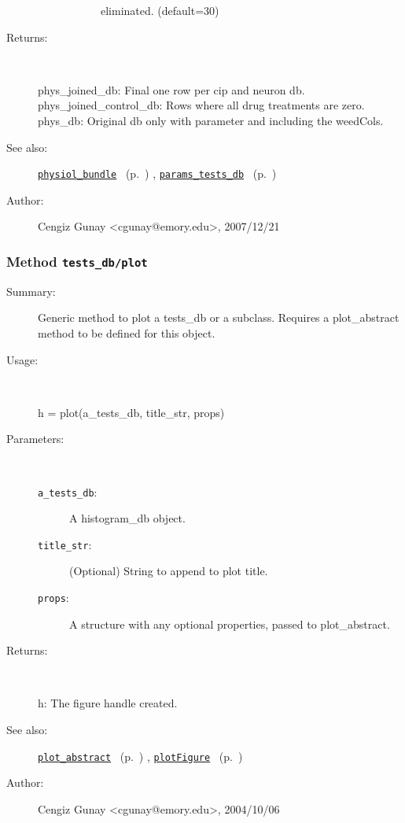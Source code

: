\begin{description}
\begin{description}
\begin{description}
eliminated. (default=30)
\end{description}%
\end{description}%
%
\item[Returns:
]~

	phys\_joined\_db: Final one row per cip and neuron db.
	phys\_joined\_control\_db: Rows where all drug treatments are zero.
	phys\_db: Original db only with parameter and including the weedCols.
%
%
\item[See also:]%
\hyperlink{ref_physiol_bundle}{\texttt{physiol\_bundle}}%
\ (p.~\pageref{ref_physiol_bundle})%
%
, \hyperlink{ref_params_tests_db}{\texttt{params\_tests\_db}}%
\ (p.~\pageref{ref_params_tests_db})%
%
%
\item[Author:]%
Cengiz Gunay <cgunay@emory.edu>, 2007/12/21
%
\end{description}
\methodline%
\subsubsection[Method \texttt{plot}]{Method \texttt{tests\_db/plot}}%
%
\label{ref_tests_db__plot}%
\hypertarget{ref_tests_db__plot}{}%
\begin{description}
\item[Summary:]Generic method to plot a tests\_db or a subclass. Requires a 
	plot\_abstract method to be defined for this object.
%
\item[Usage:]~%
\begin{lyxcode}%
h = plot(a\_tests\_db, title\_str, props)
%
\end{lyxcode}%
%
%
\item[Parameters:]~
\begin{description}%
\item[\texttt{a\_tests\_db}:]
 A histogram\_db object.
\item[\texttt{title\_str}:]
 (Optional) String to append to plot title.
\item[\texttt{props}:]
 A structure with any optional properties, passed to plot\_abstract.
\end{description}%
%
\item[Returns:
]~

	h: The figure handle created.
%
%
\item[See also:]%
\hyperlink{ref_plot_abstract}{\texttt{plot\_abstract}}%
\ (p.~\pageref{ref_plot_abstract})%
%
, \hyperlink{ref_plotFigure}{\texttt{plotFigure}}%
\ (p.~\pageref{ref_plotFigure})%
%
%
\item[Author:]%
Cengiz Gunay <cgunay@emory.edu>, 2004/10/06
%
\end{description}
\methodline%
